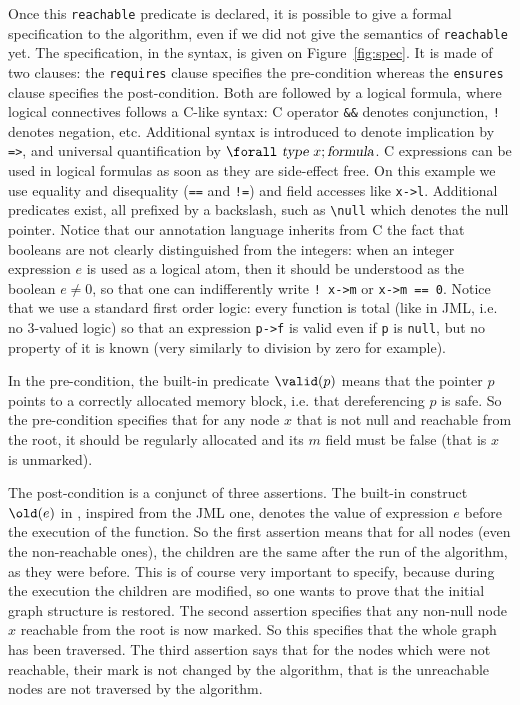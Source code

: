 Once this \texttt{reachable} predicate is declared, it is possible to
give a formal specification to the algorithm, even if we did not give
the semantics of \texttt{reachable} yet. The specification, in the
\caduceus{} syntax, is given on Figure~\ref{fig:spec}. It is made of
two clauses: the \texttt{requires} clause specifies the pre-condition
whereas the \texttt{ensures} clause specifies the post-condition. Both
are followed by a logical formula, where logical connectives follows a
C-like syntax: C operator \verb|&&| denotes conjunction, \verb|!|
denotes negation, etc. Additional syntax is introduced to denote
implication by \verb|=>|, and universal quantification by
$\bs{}\verb|forall|~\textsl{type}~x ; \textsl{formula}$. C expressions 
can be used in logical formulas as soon as they are side-effect free. On this example we use equality and disequality (\verb|==| and
\verb|!=|) and field accesses like \verb|x->l|. Additional predicates
exist, all prefixed by a backslash, such as \verb|\null| which 
denotes the null pointer. Notice that our annotation language
inherits from C the fact that booleans are not clearly distinguished
from the integers: when an integer expression $e$ is used as a logical
atom, then it should be understood as the boolean $e\neq 0$, so that
one can indifferently write \verb|! x->m| or \verb|x->m == 0|. 
Notice that we use a standard first order logic: every function is
total (like in JML, i.e. no 3-valued logic) so that an expression
\verb|p->f| is valid even if \verb|p| is \verb|null|, but no
property of it is known (very similarly to division by zero for
example). 

In the pre-condition, the built-in predicate $\valid(p)$ means that
the pointer $p$ points to a correctly allocated memory block, i.e. that
dereferencing $p$ is safe. So the pre-condition specifies that for any
node $x$ that is not null and reachable from the root, it should be
regularly allocated and its $m$ field must be false (that is $x$ is
unmarked).

The post-condition is a conjunct of three assertions. The built-in
construct $\old(e)$ in \caduceus{}, inspired from the JML one, denotes
the value of expression $e$ before the execution of the function. So
the first assertion means that for all nodes (even the non-reachable
ones), the children are the same after the run of the algorithm, as
they were before. This is of course very important to specify, because
during the execution the children are modified, so one wants to prove
that the initial graph structure is restored. The second
assertion specifies that any non-null node $x$ reachable from the
root is now marked. So this specifies that the whole 
graph has been traversed. The third assertion says that for the nodes
which were not reachable, their mark is not changed by the algorithm,
that is the unreachable nodes are not traversed by the algorithm.

